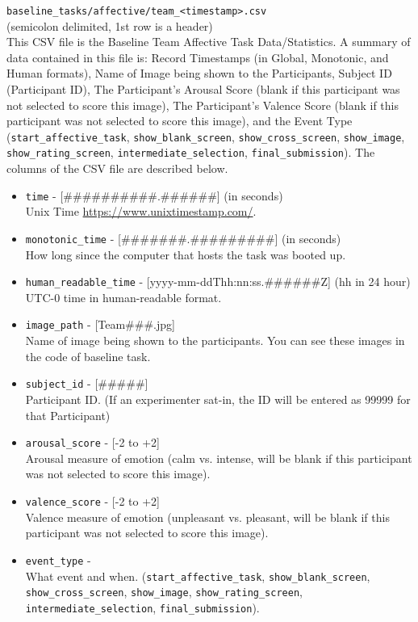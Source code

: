 \begin{description}
\medskip
\item\verb|baseline_tasks/affective/team_<timestamp>.csv| \\
    (semicolon delimited, 1st row is a header) \\
    This CSV file is the Baseline Team Affective Task Data/Statistics. A
    summary of data contained in this file is: Record Timestamps (in Global,
    Monotonic, and Human formats), Name of Image being shown to the
    Participants, Subject ID (Participant ID), The Participant's Arousal Score
    (blank if this participant was not selected to score this image), The
    Participant's Valence Score (blank if this participant was not selected to
    score this image), and the Event Type (\verb|start_affective_task|,
    \verb|show_blank_screen|, \verb|show_cross_screen|, \verb|show_image|,
    \verb|show_rating_screen|, \verb|intermediate_selection|,
    \verb|final_submission|). The columns of the CSV file are described below.
    \begin{itemize}
        \item \verb|time| - [\#\#\#\#\#\#\#\#\#\#.\#\#\#\#\#\#] (in seconds)\\
            Unix Time \href{https://www.unixtimestamp.com/}{https://www.unixtimestamp.com/}.
        \item \verb|monotonic_time| - [\#\#\#\#\#\#\#.\#\#\#\#\#\#\#\#\#] (in seconds)\\
            How long since the computer that hosts the task was booted up.
        \item \verb|human_readable_time| - [yyyy-mm-ddThh:nn:ss.\#\#\#\#\#\#Z] (hh in 24 hour)\\
            UTC-0 time in human-readable format.
        \item \verb|image_path| - [Team\#\#\#.jpg]\\
            Name of image being shown to the participants. You can see these images in the code of baseline task.
        \item \verb|subject_id| - [\#\#\#\#\#]\\
            Participant ID. (If an experimenter sat-in, the ID will be entered as 99999 for that Participant)
        \item \verb|arousal_score| - [-2 to +2]\\
            Arousal measure of emotion (calm vs. intense, will be blank if this
            participant was not selected to score this image).
        \item \verb|valence_score| - [-2 to +2]\\
            Valence measure of emotion (unpleasant vs. pleasant, will be blank
            if this participant was not selected to score this image).
        \item \verb|event_type| -\\
            What event and when.
            (\verb|start_affective_task|, \verb|show_blank_screen|,
            \verb|show_cross_screen|, \verb|show_image|, \verb|show_rating_screen|,
            \verb|intermediate_selection|, \verb|final_submission|).
    \end{itemize}



\end{description}
